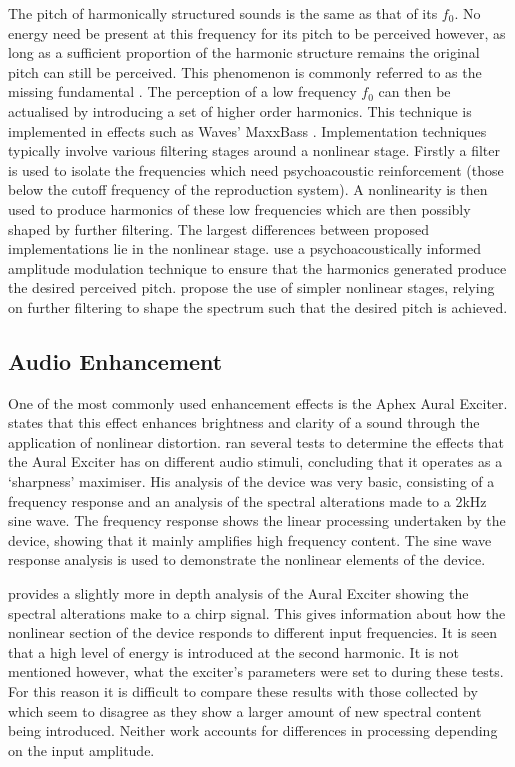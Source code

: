		The pitch of harmonically structured sounds is the same as that of its $f_{0}$. No energy need be present
		at this frequency for its pitch to be perceived however, as long as a sufficient proportion of the harmonic
		structure remains the original pitch can still be perceived. This phenomenon is commonly referred to as the
		missing fundamental \citep{plack2005the}. The perception of a low frequency $f_{0}$ can then be actualised
		by introducing a set of higher order harmonics. This technique is implemented in effects such as Waves'
		MaxxBass \citep{ben-tzur1999the}. Implementation techniques typically involve various filtering stages
		around a nonlinear stage. Firstly a filter is used to isolate the frequencies which need psychoacoustic
		reinforcement (those below the cutoff frequency of the reproduction system). A nonlinearity is then used to
		produce harmonics of these low frequencies which are then possibly shaped by further filtering. The largest
		differences between proposed implementations lie in the nonlinear stage.  \citet{gan2001virtual} use a
		psychoacoustically informed amplitude modulation technique to ensure that the harmonics generated produce
		the desired perceived pitch. \citet{larsen2002reproducing} propose the use of simpler nonlinear stages,
		relying on further filtering to shape the spectrum such that the desired pitch is achieved.

	\subsection{Audio Enhancement}
	\label{sec:Excitation-Uses-Enhancement}
		One of the most commonly used enhancement effects is the Aphex Aural Exciter. \citet{shekar2013modeling}
		states that this effect enhances brightness and clarity of a sound through the application of nonlinear
		distortion. \citet{chalupper2000aural} ran several tests to determine the effects that the Aural Exciter
		has on different audio stimuli, concluding that it operates as a `sharpness' maximiser. His analysis of the
		device was very basic, consisting of a frequency response and an analysis of the spectral alterations made
		to a 2kHz sine wave. The frequency response shows the linear processing undertaken by the device, showing
		that it mainly amplifies high frequency content. The sine wave response analysis is used to demonstrate the
		nonlinear elements of the device. 

		\citet{dutilleux2011nonlinear} provides a slightly more in depth analysis of the Aural Exciter showing the
		spectral alterations make to a chirp signal. This gives information about how the nonlinear section of the
		device responds to different input frequencies. It is seen that a high level of energy is introduced at the
		second harmonic. It is not mentioned however, what the exciter's parameters were set to during these tests.
		For this reason it is difficult to compare these results with those collected by \citet{chalupper2000aural}
		which seem to disagree as they show a larger amount of new spectral content being introduced. Neither work
		accounts for differences in processing depending on the input amplitude.

